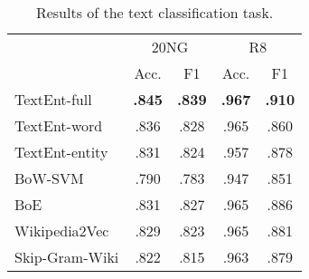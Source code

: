 \documentclass[11pt]{article}
\begin{document}
  \begin{table}[t]
    \centering
    \begin{tabular}{l|cc|cc}
      \multirow{2}{*}{} & \multicolumn{2}{c|}{20NG} & \multicolumn{2}{c}{R8}\\
      & Acc. & F1 & Acc. & F1\\
      \hline
      TextEnt-full      & \textbf{.845} & \textbf{.839} & \textbf{.967} & \textbf{.910} \\
TextEnt-word      & .836 & .828 & .965 & .860 \\
TextEnt-entity    & .831 & .824 & .957 & .878 \\
\hline
      BoW-SVM        & .790 & .783 & .947 & .851 \\
BoE            & .831 & .827 & .965 & .886 \\
      Wikipedia2Vec  & .829 & .823 & .965 & .881 \\
      Skip-Gram-Wiki & .822 & .815 & .963 & .879 \\
\end{tabular}
    \caption{Results of the text classification task.}
    \label{tb:text-classification-results}
  \end{table}
\end{document}
